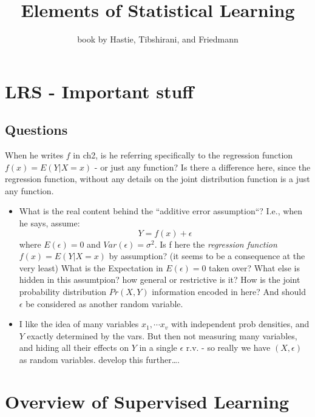 \documentclass[a4paper]{report}
\title{Elements of Statistical Learning}
\author{book by Hastie, Tibshirani, and Friedmann}
\date{}
\newcommand{\<}{\textless}
\renewcommand{\>}{\textgreater}
\begin{document}
\maketitle
\chapter{LRS - Important stuff}
\section{Questions}
When he writes $f$ in ch2, is he referring specifically to the regression function $f(x) = E(Y|X=x)$ - or just any function? Is there a difference here, since the regression function, without any details on the joint distribution function is a just any function.
\begin{itemize}
  \item What is the real content behind the ``additive error assumption``? I.e., when he says, assume:
    $$ Y = f(x) + \epsilon $$
    where $E(\epsilon) = 0$ and $Var(\epsilon) = \sigma^2$.
    \subitem Is f here the \emph{regression function} $f(x) = E(Y | X = x)$ by assumption? (it seems to be a consequence at the very least)
    \subitem What is the Expectation in $E(\epsilon) = 0$ taken over?
    \subitem What else is hidden in this assumtpion? how general or restrictive is it?
    \subitem How is the joint probability distribution $Pr(X,Y)$ information encoded in here? And should $\epsilon$ be considered as another random variable.
  \item I like the idea of many variables $x_1, \cdots x_v$ with independent prob densities, and $Y$ exactly determined by the vars. But then not measuring many variables, and hiding all their effects on $Y$ in a single $\epsilon$ r.v. -  so really we have $(X,\epsilon)$ as random variables.
    \subitem develop this further\ldots.
\end{itemize}

\setcounter{chapter}{1}
\chapter{Overview of Supervised Learning}

\setcounter{section}{-1}
\end{document}
